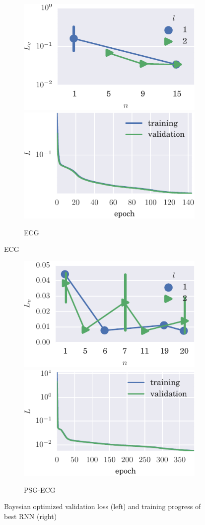 \begin{figure}[!hp]
\ContinuedFloat

    \begin{subfigure}[t]{\textwidth} 
        \includegraphics[width=.5\textwidth]{figs/bo_ecg.pdf}
        \includegraphics[width=.5\textwidth]{figs/trn_ecg.pdf}
        \caption{ECG}
    \end{subfigure}%

\end{figure}
\begin{figure}[!h] %
\ContinuedFloat

    \begin{subfigure}[t]{\textwidth} 
        \includegraphics[width=.5\textwidth]{figs/bo_sleep.pdf}
        \includegraphics[width=.5\textwidth]{figs/trn_sleep.pdf}
        \caption{PSG-ECG}
    \end{subfigure}%

\label{fig:bo}
\caption[Training results]{Bayesian optimized validation loss (left) and training progress of best RNN (right)} %
\end{figure}



